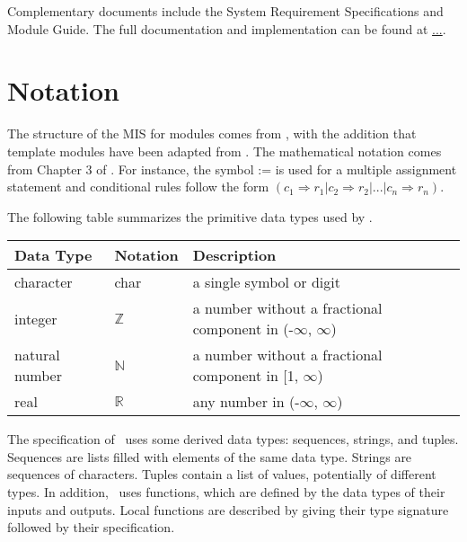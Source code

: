 \documentclass[12pt, titlepage]{article}
\begin{document}
Complementary documents include the System Requirement Specifications and Module Guide. The full
documentation and implementation can be found at \url{...}. 

\section{Notation}


The structure of the MIS for modules comes from \citet{HoffmanAndStrooper1995}, with the addition
that template modules have been adapted from \cite{GhezziEtAl2003}. The mathematical notation comes
from Chapter 3 of \citet{HoffmanAndStrooper1995}. For instance, the symbol := is used for a
multiple assignment statement and conditional rules follow the form $(c_1 \Rightarrow r_1 | c_2
	\Rightarrow r_2 | ... | c_n \Rightarrow r_n )$.

The following table summarizes the primitive data types used by \progname.

\begin{center}
	\renewcommand{\arraystretch}{1.2}
	\noindent
	\begin{tabular}{l l p{7.5cm}}
		\toprule
		\textbf{Data Type} & \textbf{Notation} & \textbf{Description}                                             \\
		\midrule
		character          & char              & a single symbol or digit                                         \\
		integer            & $\mathbb{Z}$      & a number without a fractional component in (-$\infty$, $\infty$) \\
		natural number     & $\mathbb{N}$      & a number without a fractional component in [1, $\infty$)         \\
		real               & $\mathbb{R}$      & any number in (-$\infty$, $\infty$)                              \\
		\bottomrule
	\end{tabular}
\end{center}

\noindent
The specification of \progname \ uses some derived data types: sequences, strings, and
tuples. Sequences are lists filled with elements of the same data type. Strings
are sequences of characters. Tuples contain a list of values, potentially of
different types. In addition, \progname \ uses functions, which
are defined by the data types of their inputs and outputs. Local functions are
described by giving their type signature followed by their specification.
\end{document}
